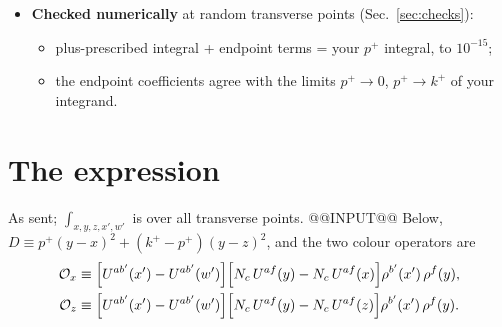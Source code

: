 \documentclass[10pt]{article}
\begin{document}
\begin{itemize}
\item \textbf{Checked numerically} at random transverse points (Sec.~\ref{sec:checks}):
\begin{itemize}
\item plus-prescribed integral + endpoint terms = your $p^+$ integral, to $10^{-15}$;
\item the endpoint coefficients agree with the limits $p^+\to0$, $p^+\to k^+$ of your integrand.
\end{itemize}
\end{itemize}

\section{The expression}
As sent; $\int_{x,y,z,x',w'}$ is over all transverse points.
@@INPUT@@
Below, $D\equiv p^{+}(y-x)^{2}+(k^{+}-p^{+})(y-z)^{2}$, and the two colour operators are
\begin{align}
{\cal O}_x&\equiv\Big[U^{ab'}(x')-U^{ab'}(w')\Big]\Big[N_{c}\,U^{af}(y)-N_{c}\,U^{af}(x)\Big]\rho^{b'}(x')\,\rho^{f}(y),\notag\\
{\cal O}_z&\equiv\Big[U^{ab'}(x')-U^{ab'}(w')\Big]\Big[N_{c}\,U^{af}(y)-N_{c}\,U^{af}(z)\Big]\rho^{b'}(x')\,\rho^{f}(y).
\end{align}
\end{document}
